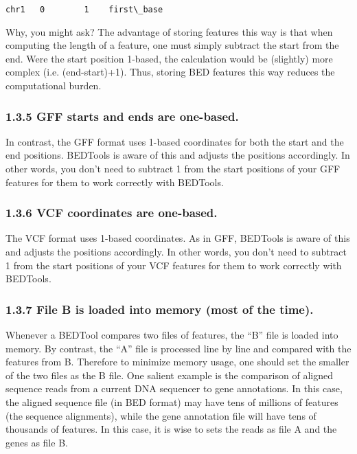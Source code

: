 \documentclass[letterpaper,10pt,english]{sphinxmanual}
\begin{document}
\begin{Verbatim}[commandchars=\\\{\}]
chr1   0        1    first\_base
\end{Verbatim}

Why, you might ask? The advantage of storing features this way is that when computing the length of a feature, one must simply subtract the start from the end. Were the start position 1-based,
the calculation would be (slightly) more complex (i.e. (end-start)+1). Thus, storing BED features this way reduces the computational burden.


\subsubsection{1.3.5 GFF starts and ends are one-based.}
\label{content/overview:gff-starts-and-ends-are-one-based}
In contrast, the GFF format uses 1-based coordinates for both the start and the end positions. BEDTools is aware of this and adjusts the positions accordingly.
In other words, you don’t need to subtract 1 from the start positions of your GFF features for them to work correctly with BEDTools.


\subsubsection{1.3.6 VCF coordinates are one-based.}
\label{content/overview:vcf-coordinates-are-one-based}
The VCF format uses 1-based coordinates. As in GFF, BEDTools is aware of this and adjusts the positions accordingly.
In other words, you don’t need to subtract 1 from the start positions of your VCF features for them to work correctly with BEDTools.


\subsubsection{1.3.7 File B is loaded into memory (most of the time).}
\label{content/overview:file-b-is-loaded-into-memory-most-of-the-time}
Whenever a BEDTool compares two files of features, the “B” file is loaded into memory. By contrast, the “A” file is processed line by line and compared with the features from B.
Therefore to minimize memory usage, one should set the smaller of the two files as the B file. One salient example is the comparison of aligned sequence reads from a
current DNA sequencer to gene annotations.      In this case, the aligned sequence file (in BED format) may have tens of millions of features (the sequence alignments),
while the gene annotation file will have tens of thousands of features. In this case, it is wise to sets the reads as file A and the genes as file B.
\end{document}

